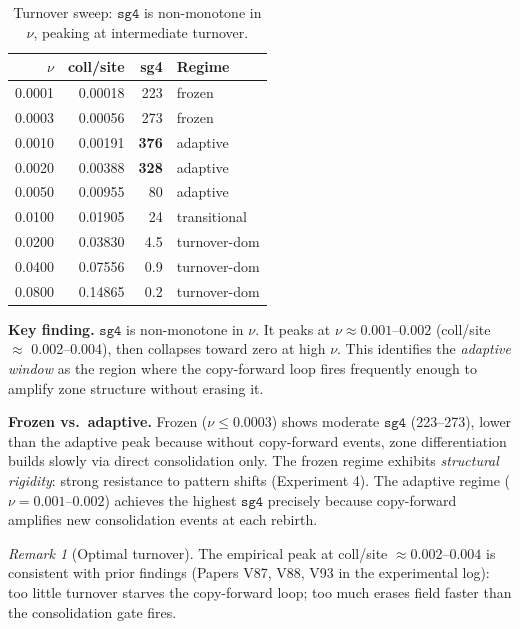 \documentclass[11pt]{article}
\theoremstyle{remark}
\newtheorem{remark}[theorem]{Remark}
\begin{document}
\begin{table}[h]
\centering
\caption{Turnover sweep: $\mathtt{sg4}$ is non-monotone in $\nu$, peaking at
intermediate turnover.}
\label{tab:exp1}
\begin{tabular}{rrrl}
\toprule
$\nu$ & coll/site & sg4 & Regime \\
\midrule
0.0001 & 0.00018 & 223 & frozen \\
0.0003 & 0.00056 & 273 & frozen \\
0.0010 & 0.00191 & \textbf{376} & adaptive \\
0.0020 & 0.00388 & \textbf{328} & adaptive \\
0.0050 & 0.00955 & 80  & adaptive \\
0.0100 & 0.01905 & 24  & transitional \\
0.0200 & 0.03830 & 4.5 & turnover-dom \\
0.0400 & 0.07556 & 0.9 & turnover-dom \\
0.0800 & 0.14865 & 0.2 & turnover-dom \\
\bottomrule
\end{tabular}
\end{table}

\textbf{Key finding.} $\mathtt{sg4}$ is non-monotone in $\nu$. It peaks at
$\nu \approx 0.001$--$0.002$ (coll/site $\approx$ 0.002--0.004), then collapses
toward zero at high $\nu$. This identifies the \emph{adaptive window} as the
region where the copy-forward loop fires frequently enough to amplify zone
structure without erasing it.

\textbf{Frozen vs.\ adaptive.} Frozen ($\nu \leq 0.0003$) shows moderate
$\mathtt{sg4}$ (223--273), lower than the adaptive peak because without
copy-forward events, zone differentiation builds slowly via direct consolidation
only. The frozen regime exhibits \emph{structural rigidity}: strong resistance
to pattern shifts (Experiment 4). The adaptive regime ($\nu = 0.001$--$0.002$)
achieves the highest $\mathtt{sg4}$ precisely because copy-forward amplifies
new consolidation events at each rebirth.

\begin{remark}[Optimal turnover]
The empirical peak at coll/site $\approx 0.002$--$0.004$ is consistent with
prior findings (Papers V87, V88, V93 in the experimental log): too little turnover
starves the copy-forward loop; too much erases field faster than the consolidation
gate fires.
\end{remark}

\end{document}
